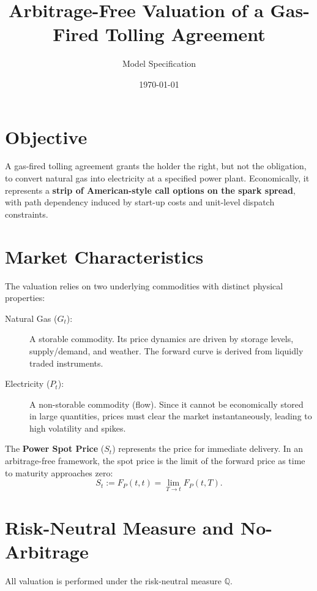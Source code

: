 \documentclass{article}
\title{\textbf{Arbitrage-Free Valuation of a Gas-Fired Tolling Agreement}}
\author{Model Specification}
\date{\today}
\begin{document}
\maketitle

\section{Objective}

A gas-fired tolling agreement grants the holder the right, but not the obligation,
to convert natural gas into electricity at a specified power plant.
Economically, it represents a \textbf{strip of American-style call options on the spark spread},
with path dependency induced by start-up costs and unit-level dispatch constraints.

\section{Market Characteristics}

The valuation relies on two underlying commodities with distinct physical properties:

\begin{description}
    \item[Natural Gas ($G_t$):] A storable commodity. Its price dynamics are driven by storage levels, supply/demand, and weather. The forward curve is derived from liquidly traded instruments.
    \item[Electricity ($P_t$):] A non-storable commodity (flow). Since it cannot be economically stored in large quantities, prices must clear the market instantaneously, leading to high volatility and spikes.
\end{description}

The \textbf{Power Spot Price} ($S_t$) represents the price for immediate delivery. In an arbitrage-free framework, the spot price is the limit of the forward price as time to maturity approaches zero:
\[
S_t := F_P(t,t) = \lim_{T \to t} F_P(t, T).
\]

\section{Risk-Neutral Measure and No-Arbitrage}

All valuation is performed under the risk-neutral measure $\mathbb Q$.
\end{document}
